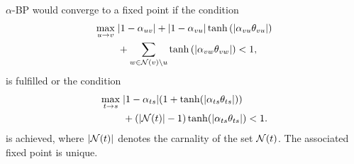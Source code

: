 \begin{corollary}
  $\alpha$-BP would converge to a fixed point if the condition
  \begin{align}
    \underset{u \rightarrow v}{\max}\; & | 1-\alpha_{uv} | + | 1-\alpha_{vu} |\tanh{(| \alpha_{vu} \theta_{vu} |)} \nonumber \\
                           &+ \sum_{w \in \mathcal{N}(v) \backslash u} \tanh{(| \alpha_{{vw}} \theta_{vw} |)} < 1,
  \end{align}
  is fulfilled or the condition
  \begin{align}
    \underset{t \rightarrow s}{\max}\; &| 1-\alpha_{ts} | (1 + \tanh(| \alpha_{ts} \theta_{ts} |)) \nonumber \\
                           &+ (| \mathcal{N}(t) |-1)\tanh(| \alpha_{ts} \theta_{ts} |) < 1.
  \end{align}
  is achieved, where $| \mathcal{N}(t) |$ denotes the carnality of the set $\mathcal{N}(t)$. The associated fixed point is unique.
\end{corollary}

